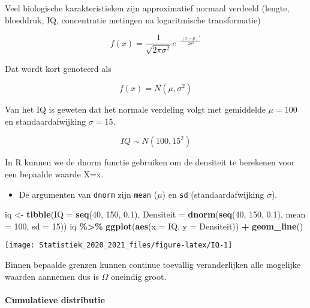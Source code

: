 \documentclass[
  12pt,dutch,coursenotes]{book}
\newenvironment{Shaded}{\begin{snugshade}}{\end{snugshade}}
\newcommand{\DataTypeTok}[1]{\textcolor[rgb]{0.13,0.29,0.53}{#1}}
\newcommand{\DecValTok}[1]{\textcolor[rgb]{0.00,0.00,0.81}{#1}}
\newcommand{\FloatTok}[1]{\textcolor[rgb]{0.00,0.00,0.81}{#1}}
\newcommand{\KeywordTok}[1]{\textcolor[rgb]{0.13,0.29,0.53}{\textbf{#1}}}
\newcommand{\NormalTok}[1]{#1}
\newcommand{\OperatorTok}[1]{\textcolor[rgb]{0.81,0.36,0.00}{\textbf{#1}}}
\newcommand{\StringTok}[1]{\textcolor[rgb]{0.31,0.60,0.02}{#1}}
\providecommand{\tightlist}{%
  \setlength{\itemsep}{0pt}\setlength{\parskip}{0pt}}
\theoremstyle{definition}
\theoremstyle{definition}
\theoremstyle{definition}
\theoremstyle{remark}
\begin{document}
Veel biologische karakteristieken zijn approximatief normaal verdeeld (lengte, bloeddruk, IQ, concentratie metingen na logaritmische transformatie)

\[f(x) = \frac{1}{\sqrt{2\pi\sigma^2}} e^{-\frac{(x-\mu)^2}{2\sigma^2}}\]

Dat wordt kort genoteerd als

\[f(x) = N(\mu,\sigma^2)\]

Van het IQ is geweten dat het normale verdeling volgt met gemiddelde \(\mu=100\) en standaardafwijking \(\sigma=15\).

\[IQ \sim N(100,15^2)\]

In R kunnen we de dnorm functie gebruiken om de densiteit te berekenen voor een bepaalde waarde X=x.

\begin{itemize}
\tightlist
\item
  De argumenten van \texttt{dnorm} zijn \texttt{mean} (\(\mu\)) en \texttt{sd} (standaardafwijking \(\sigma\)).
\end{itemize}

\begin{Shaded}
\begin{Highlighting}[]
\NormalTok{iq \textless{}{-}}\StringTok{ }\KeywordTok{tibble}\NormalTok{(}\DataTypeTok{IQ =} \KeywordTok{seq}\NormalTok{(}\DecValTok{40}\NormalTok{, }\DecValTok{150}\NormalTok{, }\FloatTok{0.1}\NormalTok{), }\DataTypeTok{Densiteit =} \KeywordTok{dnorm}\NormalTok{(}\KeywordTok{seq}\NormalTok{(}\DecValTok{40}\NormalTok{, }
    \DecValTok{150}\NormalTok{, }\FloatTok{0.1}\NormalTok{), }\DataTypeTok{mean =} \DecValTok{100}\NormalTok{, }\DataTypeTok{sd =} \DecValTok{15}\NormalTok{))}
\NormalTok{iq }\OperatorTok{\%\textgreater{}\%}\StringTok{ }\KeywordTok{ggplot}\NormalTok{(}\KeywordTok{aes}\NormalTok{(}\DataTypeTok{x =}\NormalTok{ IQ, }\DataTypeTok{y =}\NormalTok{ Densiteit)) }\OperatorTok{+}\StringTok{ }\KeywordTok{geom\_line}\NormalTok{()}
\end{Highlighting}
\end{Shaded}

\begin{center}\texttt{[image: Statistiek\_2020\_2021\_files/figure-latex/IQ-1]} \end{center}

Binnen bepaalde grenzen kunnen continue toevallig veranderlijken alle mogelijke waarden aannemen dus is \(\Omega\) oneindig groot.

\hypertarget{cumulatieve-distributie}{%
\paragraph{Cumulatieve distributie}\label{cumulatieve-distributie}}
\end{document}
